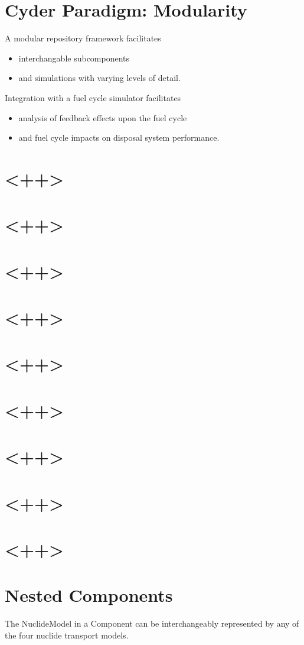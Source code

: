 \documentclass[letterpaper]{article}
\begin{document}
\section*{Cyder Paradigm: Modularity}
A modular repository framework facilitates
\begin{itemize}
\item interchangable subcomponents
\item and simulations with varying levels of detail.
\end{itemize}
Integration with a fuel cycle simulator facilitates
\begin{itemize}
\item analysis of feedback effects upon the fuel cycle
\item and fuel cycle impacts on disposal system performance.
\end{itemize}

\section*{<++>}
\section*{<++>}
\section*{<++>}
\section*{<++>}
\section*{<++>}
\section*{<++>}
\section*{<++>}
\section*{<++>}
\section*{<++>}

  \section*{Nested Components}
  The NuclideModel in a Component can be interchangeably represented by any of 
  the four nuclide transport models. 
\end{document}
